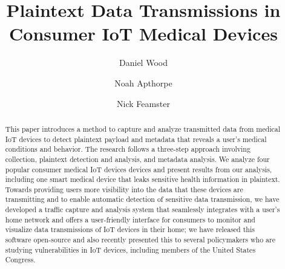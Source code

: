 \documentclass[sigconf]{acmart}
\begin{document}
\title{Plaintext Data Transmissions in Consumer IoT Medical Devices} %
\author{Daniel Wood}
\author{Noah Apthorpe}
\author{Nick Feamster}

\renewcommand{\shortauthors}{D. Wood et al.}


\begin{abstract} 
This paper introduces a method to
capture and analyze transmitted data from medical IoT devices to detect plaintext
payload and metadata that reveals a user's
medical conditions and
behavior. 
The research follows a three-step approach involving collection, plaintext detection
and analysis, and metadata analysis. 
We analyze four popular consumer medical IoT devices devices and present 
results from our analysis, including one smart medical device that leaks sensitive
health information in plaintext. 
Towards providing users more visibility into the data that these devices are transmitting
and to enable automatic detection of sensitive data transmission,
we have developed a traffic capture and analysis system that seamlessly integrates
with a user's home network and offers
a user-friendly interface for consumers to monitor and visualize data transmissions
of IoT devices in their home; we have released this software open-source and also
recently presented this to several policymakers who are studying vulnerabilities
in IoT devices, including members of the United States Congress.
\end{abstract}


\maketitle


\pagebreak

\balance
\end{document}
